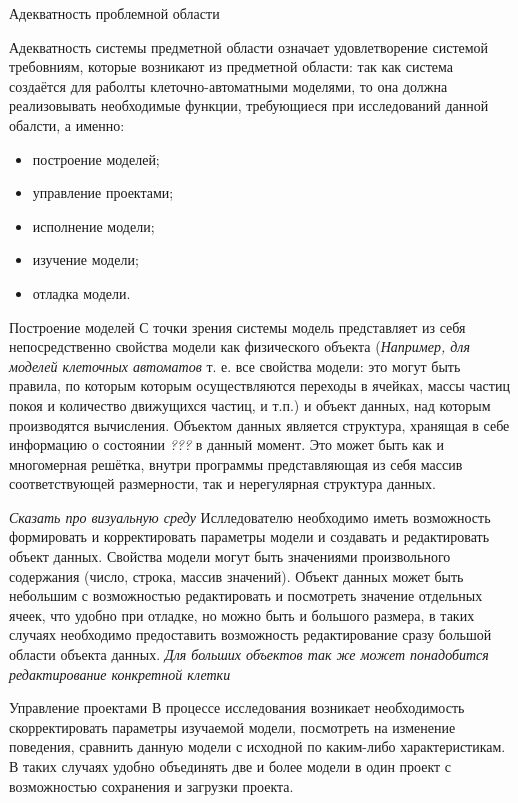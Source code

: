 \documentclass[a4paper,12pt]{extarticle}
\begin{document}
\begin{subsection}{Адекватность проблемной области}
    \label{sec:requirements-adequacy}

    Адекватность системы предметной области означает удовлетворение системой требовниям, которые возникают из предметной области: так как система создаётся для раболты клеточно-автоматными моделями, то она должна реализовывать необходимые функции, требующиеся при исследований данной обалсти, а именно:
    \begin{itemize}
        \item построение моделей;
        \item управление проектами;
        \item исполнение модели;
        \item изучение модели;
        \item отладка модели.
    \end{itemize}

    \begin{subsubsection}{Построение моделей}
        С точки зрения системы модель представляет из себя непосредственно свойства модели как физического объекта (\textit{Например, для моделей клеточных автоматов} т. е. все свойства модели: это могут быть правила, по которым которым осуществляются переходы в ячейках, массы частиц покоя и количество движущихся частиц, и т.п.) и объект данных, над которым производятся вычисления. Объектом данных является структура, хранящая в себе информацию о состоянии \textit{???} в данный момент. Это может быть как и многомерная решётка, внутри программы представляющая из себя массив соответствующей размерности, так и нерегулярная структура данных.
        
        \textit{Сказать про визуальную среду} Ислледователю необходимо иметь возможность формировать и корректировать параметры модели и создавать и редактировать объект данных. Свойства модели могут быть значениями произвольного содержания (число, строка, массив значений). Объект данных может быть небольшим с возможностью редактировать и посмотреть значение отдельных ячеек, что удобно при отладке, но можно быть и большого размера, в таких случаях необходимо предоставить возможность редактирование сразу большой области объекта данных. \textit{Для больших объектов так же может понадобится редактирование конкретной клетки}
    \end{subsubsection}
        
    \begin{subsubsection}{Управление проектами}
        В процессе исследования возникает необходимость скорректировать параметры изучаемой модели, посмотреть на изменение поведения, сравнить данную модели с исходной по каким-либо характеристикам. В таких случаях удобно объединять две и более модели в один проект с возможностью сохранения и загрузки проекта. 
        

\end{subsubsection}
\end{subsection}
\end{document}

